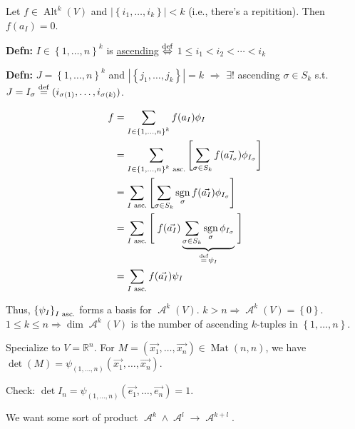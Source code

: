 \documentclass[10pt,letterpaper]{article}
\newcommand{\n}{\hfill\break}
\newcommand{\defn}[1]{\par\noindent\settowidth{\hangindent}{\textbf{Defn: }}\textbf{Defn: }#1\n}
\newcommand{\ptxt}[1]{\textrm{\textnormal{#1}}}
\newcommand{\card}[1]{\left|#1\right|}
\newcommand{\set}[1]{\left\{#1\right\}}
\newcommand{\reals}{\mathbb{R}}
\newcommand{\R}{\reals}
\DeclareMathOperator{\sgn}{sgn}
\DeclareMathOperator{\Mat}{Mat}
\DeclareMathOperator{\A}{\mathcal{A}}
\DeclareMathOperator{\Alt}{Alt}
\newcommand{\st}{s.t.}
\newcommand{\unique}{!}
\newcommand{\iffdef}{\overset{\ptxt{def}}{\Leftrightarrow}}
\newcommand{\eqdef}{\overset{\ptxt{def}}{=}}
\renewcommand{\brack}[1]{\left[#1\right]}
\begin{document}
\par\noindent\n
Let $f\in\Alt^{k}(V)$ and $\card{\set{i_{1},\ldots,i_{k}}}<k$ (i.e., there's a repitition). Then $f(a_{I})=0$.\n

\defn{$I\in\set{1,\ldots,n}^{k}$ is \underline{ascending} $\iffdef$ $1\le{}i_{1}<i_{2}<\cdots<i_{k}$}

\defn{$J=\set{1,\ldots,n}^{k}$ and $\card{\set{j_{1},\ldots,j_{k}}}=k$ $\Rightarrow$ $\exists\unique$ ascending $\sigma\in{}S_{k}$ \st{} $J=I_{\sigma}\eqdef(i_{\sigma(1)},\ldots,i_{\sigma(k)})$.}

\begin{align*}
	f & =\sum_{I\in\set{1,\ldots,n}^{k}}f(a_{I})\phi_{I}\\
	& =\sum_{I\in\set{1,\ldots,n}^{k}\ptxt{ asc.}}\brack{\sum_{\sigma\in{}S_{k}}f(\vec{a_{I_{\sigma}}})\phi_{I_{\sigma}}}\\
	& =\sum_{I\ptxt{ asc.}}\brack{\sum_{\sigma\in{}S_{k}}\sgn_{\sigma}f(\vec{a_{I}})\phi_{I_{\sigma}}}\\
	& =\sum_{I\ptxt{ asc.}}\left[\vphantom{\sum_{\sigma\in{}S_{k}}}\right.f(\vec{a_{I}})\underbrace{\sum_{\sigma\in{}S_{k}}\sgn_{\sigma}\phi_{I_{\sigma}}}_{\eqdef\psi_{I}}\left.\vphantom{\sum_{\sigma\in{}S_{k}}}\right]\\
	& =\sum_{I\ptxt{ asc.}}f(\vec{a_{I}})\psi_{I}
\end{align*}

\par\noindent Thus, $\set{\psi_{I}}_{I\ptxt{ asc.}}$ forms a basis for $\A^{k}(V)$.\n
$k>n\Rightarrow\A^{k}(V)=\set{0}$.\n
$1\le{}k\le{}n\Rightarrow\dim\A^{k}(V)$ is the number of ascending $k$-tuples in $\set{1,\ldots,n}$.\n

\par\noindent Specialize to $V=\R^{n}$.\n
For $M=(\vec{x_{1}},\ldots,\vec{x_{n}})\in\Mat(n,n)$, we have $\det(M)=\psi_{(1,\ldots,n)}(\vec{x_{1}},\ldots,\vec{x_{n}})$.\n

\par\noindent Check: $\det{}I_{n}=\psi_{(1,\ldots,n)}(\vec{e_{1}},\ldots,\vec{e_{n}})=1$.\n

\par\noindent We want some sort of product $\A^{k}\wedge\A^{l}\to\A^{k+l}$.
\end{document}
